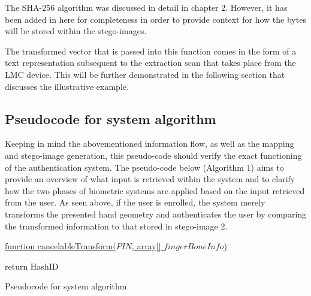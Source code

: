 
The SHA-256 algorithm was discussed in detail in chapter 2. However, it has been added in here for completeness in order to provide context for how the bytes will be stored within the stego-images. 

The transformed vector that is passed into this function comes in the form of a text representation subsequent to the extraction scan that takes place from the LMC device. This will be further demonstrated in the following section that discusses the illustrative example.


\subsection{Pseudocode for system algorithm}

Keeping in mind the abovementioned information flow, as well as the mapping and stego-image generation, this pseudo-code should verify the exact functioning of the authentication system.
The pseudo-code below (Algorithm 1) aims to provide an overview of what input is retrieved within the system and to clarify how the two phases of biometric systems are applied based on the input retrieved from the user. As seen above, if the user is enrolled, the system merely transforms the presented hand geometry and authenticates the user by comparing the transformed information to that stored in stego-image 2.


\begin{algorithm}
     
     \underline{function cancelableTransform($PIN$, array[] $fingerBoneInfo$)}\;
     
        
      return HashID\;
     
     
     \caption{Pseudocode for system algorithm}
\end{algorithm}

